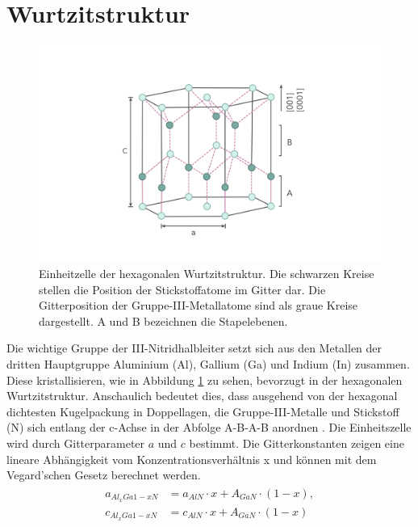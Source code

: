 \section{Wurtzitstruktur}

\begin{figure}[!htb]
    \centering
    \begin{minipage}[t]{\linewidth}
        \centering
        \includegraphics[width=0.8\linewidth]{Bilder/Wurtzite.png}
    \end{minipage}%
     \caption{Einheitzelle der hexagonalen Wurtzitstruktur. Die schwarzen Kreise stellen die Position der Stickstoffatome im Gitter dar. Die Gitterposition der Gruppe-III-Metallatome sind als graue Kreise dargestellt. A und B bezeichnen die Stapelebenen.}
        \label{fig:wurtz}
\end{figure}
\noindent
Die wichtige Gruppe der III-Nitridhalbleiter setzt sich aus den Metallen
der dritten Hauptgruppe Aluminium (Al), Gallium (Ga) und Indium (In) zusammen.
Diese kristallisieren, wie in Abbildung \ref{fig:wurtz} zu sehen, bevorzugt in der hexagonalen Wurtzitstruktur. Anschaulich bedeutet dies, dass ausgehend von der hexagonal dichtesten Kugelpackung in Doppellagen, die Gruppe-III-Metalle und Stickstoff (N) sich entlang der c-Achse in der Abfolge A-B-A-B anordnen \cite{buchc}. Die Einheitszelle wird durch Gitterparameter $a$ und $c$ bestimmt. Die Gitterkonstanten zeigen eine lineare Abhängigkeit vom Konzentrationsverhältnis x und können mit dem Vegard'schen Gesetz berechnet werden.
%
\begin{align}
\begin{split}
    a_{Al_{x}Ga{1-x}N} &= a_{AlN} \cdot x + A_{GaN} \cdot (1-x)  ,
    \\
    c_{Al_{x}Ga{1-x}N} &= c_{AlN} \cdot x + A_{GaN} \cdot (1-x) 
\end{split}
\end{align}
